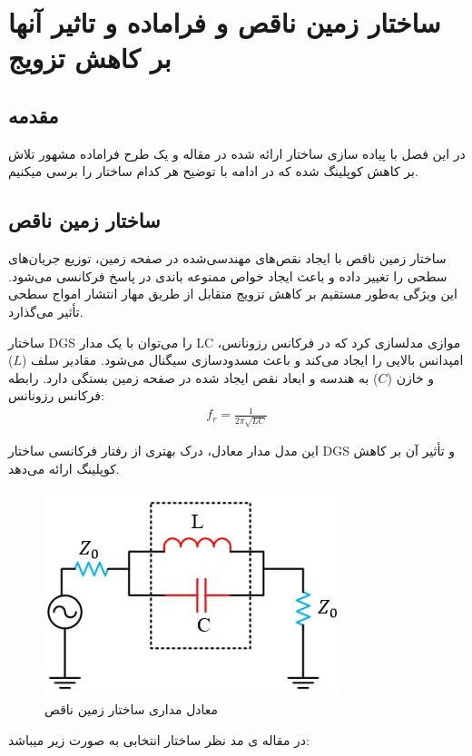 \newpage 
\chapter{ ساختار زمین ناقص و فراماده و تاثیر آنها بر کاهش تزویج}
\label{ch:3}
\section{مقدمه}
در این فصل با پیاده سازی ساختار ارائه شده در مقاله
\cite{carver1981microstrip}
و یک طرح فراماده مشهور تلاش بر کاهش کوپلینگ شده که در ادامه با توضیح هر کدام ساختار را برسی میکنیم.

\section{ساختار زمین ناقص}
ساختار زمین ناقص  با ایجاد نقص‌های مهندسی‌شده در صفحه زمین، توزیع جریان‌های سطحی را تغییر داده و باعث ایجاد خواص ممنوعه باندی
 در پاسخ فرکانسی می‌شود. این ویژگی به‌طور مستقیم بر کاهش تزویج متقابل از طریق مهار انتشار امواج سطحی تأثیر می‌گذارد.
 
 
 ساختار DGS را می‌توان با یک مدار LC موازی مدلسازی کرد که در فرکانس رزونانس، امپدانس بالایی را ایجاد می‌کند و باعث مسدودسازی سیگنال می‌شود. مقادیر سلف ($L$) و خازن ($C$) به هندسه و ابعاد نقص ایجاد شده در صفحه زمین بستگی دارد.
 رابطه فرکانس رزونانس:
 \begin{align}
 	\label{eq:eq12}
	f_r = \frac{1}{2\pi\sqrt{LC}}
 \end{align}
 
 این مدل مدار معادل، درک بهتری از رفتار فرکانسی ساختار DGS و تأثیر آن بر کاهش کوپلینگ ارائه می‌دهد.
 
 
 \begin{figure}
 	\includegraphics[scale=0.5]{Images/fig26.jpg}
 	\caption{معادل مداری ساختار زمین ناقص}
 	\label{fig26}
 \end{figure}
 
 در مقاله ی مد نظر ساختار انتخابی به صورت زیر میباشد: 
 
